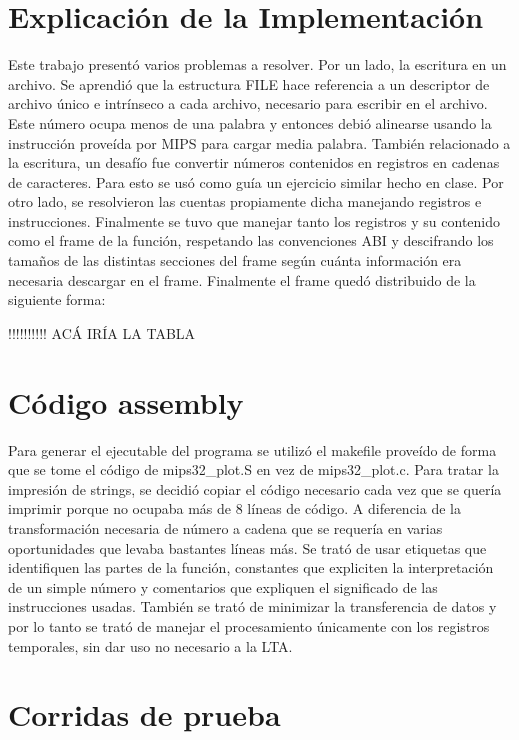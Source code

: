\documentclass[a4paper,10pt]{article}
\begin{document}
\section{Explicaci\'on de la Implementaci\'on}
Este trabajo present\'o varios problemas a resolver. 
Por un lado, la escritura en un archivo. Se aprendi\'o que la estructura FILE hace referencia a un 
descriptor de archivo \'unico e intr\'inseco a cada archivo, necesario para escribir en el archivo. 
Este n\'umero ocupa menos de una palabra y entonces debi\'o alinearse usando la instrucci\'on 
prove\'ida por MIPS para cargar media palabra. 
También relacionado a la escritura, un desaf\'io fue convertir n\'umeros contenidos en registros en 
cadenas de caracteres. Para esto se us\'o como gu\'ia un ejercicio similar hecho en clase. 
Por otro lado, se resolvieron las cuentas propiamente dicha manejando registros e instrucciones. 
Finalmente se tuvo que manejar tanto los registros y su contenido como el frame de la funci\'on, 
respetando las convenciones ABI y descifrando los tamaños de las distintas secciones del frame seg\'un 
cu\'anta informaci\'on era necesaria descargar en el frame.
Finalmente el frame qued\'o distribuido de la siguiente forma:

!!!!!!!!!! ACÁ IRÍA LA TABLA


\section{C\'odigo assembly}
Para generar el ejecutable del programa se utiliz\'o el makefile prove\'ido de forma que se tome 
el c\'odigo de mips32_plot.S en vez de mips32_plot.c. 
Para tratar la impresi\'on de strings, se decidi\'o copiar el c\'odigo necesario cada vez que se quer\'ia 
imprimir porque no ocupaba m\'as de 8 l\'ineas de c\'odigo. A diferencia de la transformaci\'on 
necesaria de n\'umero a cadena que se requer\'ia en varias oportunidades que levaba bastantes l\'ineas m\'as. 
Se trat\'o de usar etiquetas que identifiquen las partes de la funci\'on, constantes que expliciten la interpretaci\'on de un simple n\'umero y comentarios que expliquen 
el significado de las instrucciones usadas.
Tambi\'en se trat\'o de minimizar la transferencia de datos y por lo tanto se trat\'o de manejar el 
procesamiento \'unicamente con los registros temporales, sin dar uso no necesario a la LTA. 


\pagebreak




\section{Corridas de prueba}
\end{document}
